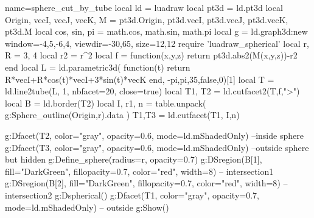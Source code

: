 \documentclass[border=5pt]{standalone}%
\begin{document}
\begin{luadraw}{name=sphere_cut_by_tube}
local ld = luadraw
local pt3d = ld.pt3d
local Origin, vecI, vecJ, vecK, M = pt3d.Origin, pt3d.vecI, pt3d.vecJ, pt3d.vecK, pt3d.M
local cos, sin, pi = math.cos, math.sin, math.pi
local g = ld.graph3d:new{ window={-4,5,-6,4}, viewdir={-30,65}, size={12,12}}
require 'luadraw_spherical'
local r, R = 3, 4
local r2 = r^2
local f = function(x,y,z) return pt3d.abs2(M(x,y,z))-r2 end
local L = ld.parametric3d( function(t) return R*vecI+R*cos(t)*vecI+3*sin(t)*vecK end, -pi,pi,35,false,0)[1]
local T = ld.line2tube(L, 1, {nbfacet=20, close=true})
local T1, T2 = ld.cutfacet2(T,f,">")
local B = ld.border(T2)
local I, r1, n = table.unpack( g:Sphere_outline(Origin,r).data )
T1,T3 = ld.cutfacet(T1, {I,n})

g:Dfacet(T2, {color="gray", opacity=0.6, mode=ld.mShadedOnly}) --inside sphere
g:Dfacet(T3, {color="gray", opacity=0.6, mode=ld.mShadedOnly}) --outside sphere but hidden
g:Define_sphere({radius=r, opacity=0.7})
g:DSregion(B[1], {fill="DarkGreen", fillopacity=0.7, color="red", width=8}) -- intersection1
g:DSregion(B[2], {fill="DarkGreen", fillopacity=0.7, color="red", width=8}) -- intersection2
g:Dspherical()
g:Dfacet(T1, {color="gray", opacity=0.7, mode=ld.mShadedOnly}) -- outside
g:Show()
\end{luadraw}
\end{document}

